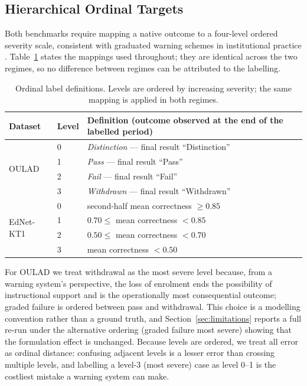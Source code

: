 \documentclass[sn-mathphys,Numbered]{sn-jnl}
\begin{document}
\subsection{Hierarchical Ordinal Targets}\label{sec:form_labels}

Both benchmarks require mapping a native outcome to a four-level ordered severity scale, consistent with graduated warning schemes in institutional practice \cite{Arnold2012,Pistolesi2017}. Table~\ref{tab:labels} states the mappings used throughout; they are identical across the two regimes, so no difference between regimes can be attributed to the labelling.

\begin{table}[ht]
\caption{Ordinal label definitions. Levels are ordered by increasing severity; the same mapping is applied in both regimes.\label{tab:labels}}
\begin{tabular*}{\textwidth}{@{\extracolsep\fill}llp{8.2cm}}
\toprule
\textbf{Dataset} & \textbf{Level} & \textbf{Definition (outcome observed at the end of the labelled period)} \\
\midrule
\multirow{4}{*}{OULAD}
 & 0 & \textit{Distinction} --- final result ``Distinction'' \\
 & 1 & \textit{Pass} --- final result ``Pass'' \\
 & 2 & \textit{Fail} --- final result ``Fail'' \\
 & 3 & \textit{Withdrawn} --- final result ``Withdrawn'' \\
\midrule
\multirow{4}{*}{EdNet-KT1}
 & 0 & second-half mean correctness $\geq 0.85$ \\
 & 1 & $0.70 \leq$ mean correctness $< 0.85$ \\
 & 2 & $0.50 \leq$ mean correctness $< 0.70$ \\
 & 3 & mean correctness $< 0.50$ \\
\bottomrule
\end{tabular*}
\end{table}

For OULAD we treat withdrawal as the most severe level because, from a warning system's perspective, the loss of enrolment ends the possibility of instructional support and is the operationally most consequential outcome; graded failure is ordered between pass and withdrawal. This choice is a modelling convention rather than a ground truth, and Section~\ref{sec:limitations} reports a full re-run under the alternative ordering (graded failure most severe) showing that the formulation effect is unchanged. Because levels are ordered, we treat all error as ordinal distance: confusing adjacent levels is a lesser error than crossing multiple levels, and labelling a level-3 (most severe) case as level 0--1 is the costliest mistake a warning system can make.
\end{document}
